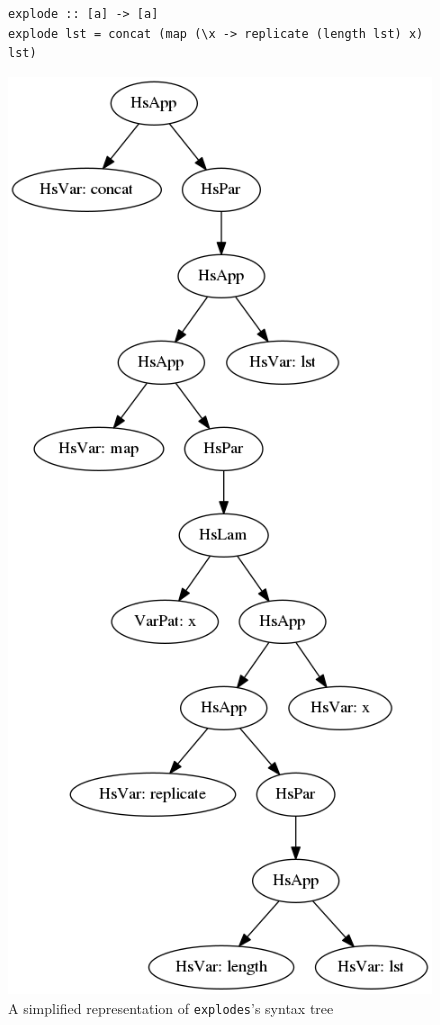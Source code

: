 \DIFaddbegin \begin{figure}[t]
\begin{lstlisting}
explode :: [a] -> [a]
explode lst = concat (map (\x -> replicate (length lst) x) lst)
\end{lstlisting}
\caption{\texttt{}}
\label{explode}
\end{figure}


\DIFaddend \begin{figure}[h!]
	\begin{center}
		\includegraphics[scale=.5]{graphVis/Chapter3/explode.png}
	\end{center}
	\caption{A simplified representation of \texttt{explodes}'s syntax tree}
	\label{explode}
\end{figure}

